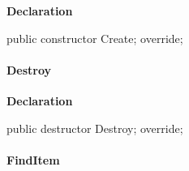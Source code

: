 \documentclass{report}
\newif\ifpdf
\begin{document}
\label{PasDoc_Items.TPasCio-Create}
\begin{list}{}{
\setlength{\itemindent}{0cm}
\setlength{\listparindent}{0cm}
\setlength{\leftmargin}{\evensidemargin}
\addtolength{\leftmargin}{\tmplength}
\settowidth{\labelsep}{X}
\addtolength{\leftmargin}{\labelsep}
\setlength{\labelwidth}{\tmplength}
}
\item[\textbf{Declaration}\hfill]
\ifpdf
\begin{flushleft}
\fi
\begin{ttfamily}
public constructor Create; override;\end{ttfamily}

\ifpdf
\end{flushleft}
\fi

\end{list}
\paragraph*{Destroy}\hspace*{\fill}

\label{PasDoc_Items.TPasCio-Destroy}
\begin{list}{}{
\setlength{\itemindent}{0cm}
\setlength{\listparindent}{0cm}
\setlength{\leftmargin}{\evensidemargin}
\addtolength{\leftmargin}{\tmplength}
\settowidth{\labelsep}{X}
\addtolength{\leftmargin}{\labelsep}
\setlength{\labelwidth}{\tmplength}
}
\item[\textbf{Declaration}\hfill]
\ifpdf
\begin{flushleft}
\fi
\begin{ttfamily}
public destructor Destroy; override;\end{ttfamily}

\ifpdf
\end{flushleft}
\fi

\end{list}
\paragraph*{FindItem}\hspace*{\fill}
\end{document}
